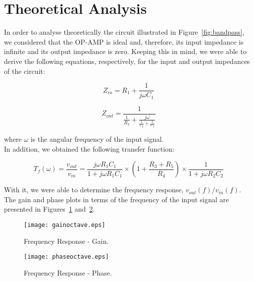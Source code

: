 \section{Theoretical Analysis}
\label{sec:analysis}

In order to analyse theoretically the circuit illustrated in Figure~\ref{fig:bandpass}, we considered that the OP-AMP is ideal and, therefore, its input impedance is infinite and its output impedance is zero. Keeping this in mind, we were able to derive the following equations, respectively, for the input and output impedances of the circuit:

\begin{equation}
Z_{in}=R_1+\frac{1}{j\omega C_1}
\end{equation}

\begin{equation}
Z_{out}=\frac{1}{\frac{1}{R_2}+\frac{j\omega}{\frac{1}{C_2}+\frac{1}{C_3}}}
\end{equation}

\noindent
where $\omega$ is the angular frequency of the input signal.\\

In addition, we obtained the following transfer function:

\begin{equation}
T_f(\omega)=\frac{v_{out}}{v_{in}}=\frac{j\omega R_1 C_1}{1+j\omega R_1 C_1}\times \left(1+\frac{R_3+R_5}{R_4}\right) \times \frac{1}{1+j\omega R_2 C_2}
\end{equation}

With it, we were able to determine the frequency response, $v_{out}(f)/v_{in}(f)$. The gain and phase plots in terms of the frequency of the input signal are presented in Figures~\ref{fig:gainteo} and~\ref{fig:phaseteo}.

\noindent
\begin{minipage}[c]{0.5\linewidth}

\begin{figure}[H] \centering
\texttt{[image: gainoctave.eps]}
\caption{Frequency Response - Gain.}
\label{fig:gainteo}
\end{figure}

\end{minipage}
\begin{minipage}[c]{0.5\linewidth}

\begin{figure}[H] \centering
\texttt{[image: phaseoctave.eps]}
\caption{Frequency Response - Phase.}
\label{fig:phaseteo}
\end{figure}

\end{minipage}

